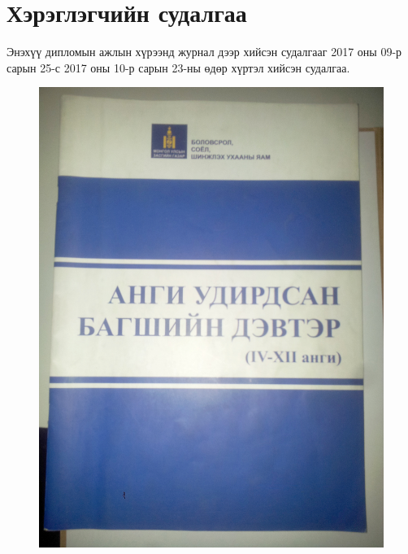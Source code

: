 \section{Хэрэглэгчийн судалгаа}
Энэхүү дипломын ажлын хүрээнд журнал дээр хийсэн судалгааг 2017 оны 09-р сарын 25-с 2017 оны 10-р сарын 23-ны өдөр хүртэл хийсэн судалгаа.
\begin{figure}[htbp]
	\centering
	\includegraphics[scale=0.05]{figures/20171006_161409.jpg}
	\centering

\end{figure}
